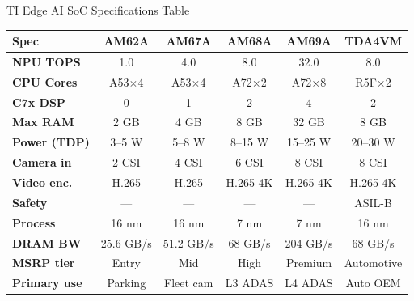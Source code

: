 \documentclass[aspectratio=169]{beamer}
\begin{document}
\begin{frame}{TI Edge AI SoC Specifications Table}
\small
\begin{tabular}{lccccc}
\toprule
\textbf{Spec} & \textbf{AM62A} & \textbf{AM67A} & \textbf{AM68A} & \textbf{AM69A} & \textbf{TDA4VM}\\
\midrule
\textbf{NPU TOPS}    & 1.0      & 4.0      & 8.0       & 32.0      & 8.0\\
\textbf{CPU Cores}   & A53$\times$4 & A53$\times$4 & A72$\times$2 & A72$\times$8 & R5F$\times$2\\
\textbf{C7x DSP}     & 0        & 1        & 2         & 4         & 2\\
\textbf{Max RAM}     & 2 GB     & 4 GB     & 8 GB      & 32 GB     & 8 GB\\
\textbf{Power (TDP)} & 3--5 W   & 5--8 W   & 8--15 W   & 15--25 W  & 20--30 W\\
\textbf{Camera in}   & 2 CSI    & 4 CSI    & 6 CSI     & 8 CSI     & 8 CSI\\
\textbf{Video enc.}  & H.265    & H.265    & H.265 4K  & H.265 4K  & H.265 4K\\
\textbf{Safety}      & ---      & ---      & ---       & ---       & ASIL-B\\
\textbf{Process}     & 16 nm    & 16 nm    & 7 nm      & 7 nm      & 16 nm\\
\textbf{DRAM BW}     & 25.6 GB/s& 51.2 GB/s& 68 GB/s  & 204 GB/s  & 68 GB/s\\
\textbf{MSRP tier}   & Entry    & Mid      & High      & Premium   & Automotive\\
\midrule
\textbf{Primary use} & Parking  & Fleet cam& L3 ADAS   & L4 ADAS   & Auto OEM\\
\bottomrule
\end{tabular}
\end{frame}
\end{document}
